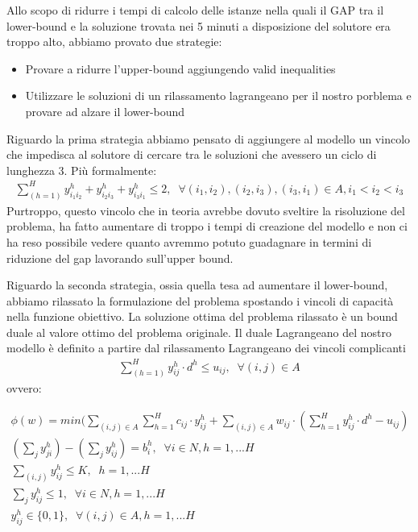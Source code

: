 \documentclass{article}
\begin{document}
Allo scopo di ridurre i tempi di calcolo delle istanze nella quali il GAP tra il lower-bound e la soluzione trovata nei 5 minuti a disposizione del solutore era troppo alto, abbiamo provato due strategie:
\begin{itemize}
    \item Provare a ridurre l'upper-bound aggiungendo valid inequalities
    \item Utilizzare le soluzioni di un rilassamento lagrangeano per il nostro porblema e provare ad alzare il lower-bound
\end{itemize}
Riguardo la prima strategia abbiamo pensato di aggiungere al modello un vincolo che impedisca al solutore di cercare tra le soluzioni che avessero un ciclo di lunghezza 3. Più formalmente:
\begin{align}
    \sum_{(h=1)}^H y_{i_{1}i_{2}}^h + y_{i_{2}i_{3}}^h + y_{i_{3}i_{1}}^h \leq 2, \; \;
    \forall (i_1,i_2), (i_2,i_3), (i_3,i_1)   \in A ,
    i_1 < i_2 < i_3
\end{align}
Purtroppo, questo vincolo che in teoria avrebbe dovuto sveltire la risoluzione del problema, ha fatto aumentare di troppo i tempi di creazione del modello e non ci ha reso possibile vedere quanto avremmo potuto guadagnare in termini di riduzione del gap lavorando sull'upper bound.

Riguardo la seconda strategia, ossia quella tesa ad aumentare il lower-bound, abbiamo rilassato la formulazione del problema spostando i vincoli di capacità nella funzione obiettivo. La soluzione ottima del problema rilassato è un bound duale al valore ottimo del problema originale.
Il duale Lagrangeano del nostro modello è definito a partire dal rilassamento Lagrangeano dei vincoli complicanti 
\begin{align}
    \sum_{(h=1)}^H y_{ij}^h \cdot d^h \leq u_{ij}, \; \; \forall (i,j) \in A
    \label{eq:vcap}
\end{align}
ovvero:

\begin{align}
    \phi(w) = min (\sum_{(i,j) \in A}\sum_{h=1}^H c_{ij} \cdot y_{ij}^h + \sum_{(i,j) \in A} w_{ij} \cdot(\sum_{h=1}^H y_{ij}^h \cdot d^h - u_{ij})
    \label{mod:obj}
    \\
    (\sum_{j}y_{ji}^h)- (\sum_{j}y_{ij}^h ) = b_i^h, \; \; \forall i \in N, h=1, ... H
    \label{mod:v2}
    \\
    \sum_{(i,j)} y_{ij}^h  \leq K, \; \; h=1, ... H
    \label{mod:v4}
    \\
    \sum_{j} y_{ij}^h \leq 1, \; \; \forall i \in \textit{N} , h=1, ... H
    \label{mod:v5}
    \\
     y_{ij}^h \in \{0,1\}, \; \; \forall (i,j) \in A, h=1, ... H
    \label{mod:lag}
\end{align}
\end{document}
